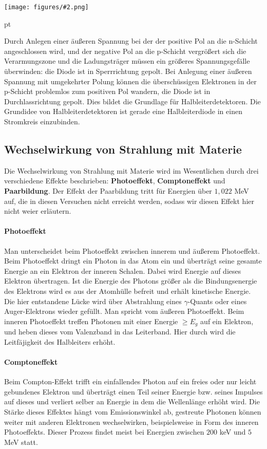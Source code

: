 \documentclass[12pt]{article}
\newcommand{\gra}[3][0.7]{
	\begin{minipage}[h!]{\textwidth}
		\centering
		\texttt{[image: figures/\#2.png]}
		\captionof{figure}{#3}
	\end{minipage}
	\vskip 30 pt
	}
\begin{document}
\gra{n-p-Diode}{Halbleiter-Diode} \cite{staat}

Durch Anlegen einer äußeren Spannung bei der der positive Pol an die n-Schicht angeschlossen wird, und der negative Pol an die p-Schicht vergrößert sich die Verarmungszone und die Ladungsträger müssen ein größeres Spannungsgefälle überwinden: die Diode ist in Sperrrichtung gepolt. Bei Anlegung einer äußeren Spannung mit umgekehrter Polung können die überschüssigen Elektronen in der p-Schicht problemlos zum positiven Pol wandern, die Diode ist in Durchlassrichtung gepolt.
Dies bildet die Grundlage für Halbleiterdetektoren. Die Grundidee von Halbleiterdetektoren ist gerade eine Halbleiterdiode in einen Stromkreis einzubinden.
\subsection{Wechselwirkung von Strahlung mit Materie \cite{anleitungkhwz}}

Die Wechselwirkung von Strahlung mit Materie wird im Wesentlichen durch drei verschiedene Effekte beschrieben: \textbf{Photoeffekt}, \textbf{Comptoneffekt} und \textbf{Paarbildung}.
Der Effekt der Paarbildung tritt für Energien über $1,022$ MeV auf, die in diesen Versuchen nicht erreicht werden, sodass wir diesen Effekt hier nicht weier erläutern.

\paragraph{Photoeffekt} Man unterscheidet beim Photoeffekt zwischen innerem und äußerem Photoeffekt.
Beim Photoeffekt dringt ein Photon in das Atom ein und überträgt seine gesamte Energie an ein Elektron der inneren Schalen. Dabei wird Energie auf dieses Elektron übertragen. Ist die Energie des Photons größer als die Bindungsenergie des Elektrons wird es aus der Atomhülle befreit und erhält kinetische Energie. Die hier entstandene Lücke wird über Abstrahlung eines $\gamma$-Quants oder eines Auger-Elektrons wieder gefüllt. Man spricht vom äußeren Photoeffekt.
Beim inneren Photoeffekt treffen Photonen mit einer Energie  $\geq E_g$ auf ein Elektron, und heben dieses vom Valenzband in das Leiterband. Hier durch wird die Leitfäjigkeit des Halbleiters erhöht.
\paragraph{Comptoneffekt} Beim Compton-Effekt trifft ein einfallendes Photon auf ein freies oder nur leicht gebundenes Elektron und überträgt einen Teil seiner Energie bzw. seines Impulses auf dieses und verliert selber an Energie in dem die Wellenlänge erhöht wird. Die Stärke dieses Effektes hängt vom Emissionswinkel ab, gestreute Photonen können weiter mit anderen Elektronen wechselwirken, beispielsweise in Form des inneren Photoeffekts. Dieser Prozess findet meist bei Energien zwischen $200$ keV und $5$ MeV statt.
\end{document}
